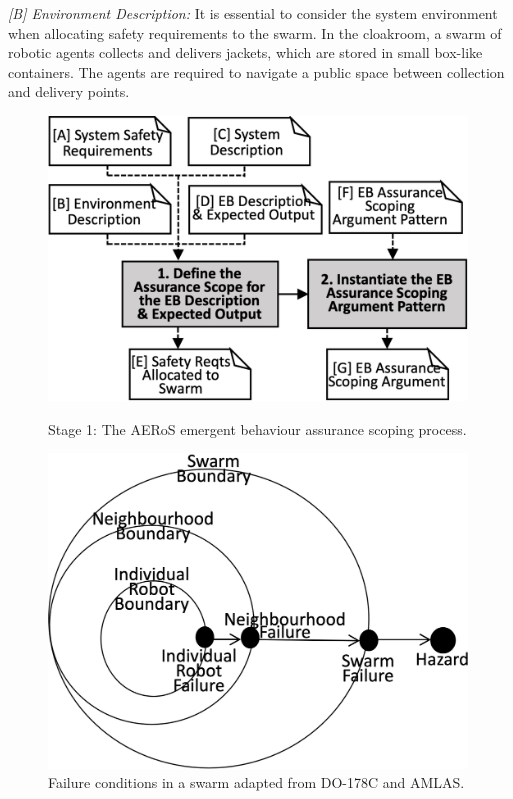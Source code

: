 \documentclass[runningheads]{llncs}
\begin{document}
	\emph{[B] Environment Description:}
	It is essential to consider the system environment when allocating safety requirements to the swarm. 
	In the cloakroom, a swarm of robotic agents collects and delivers jackets, which are stored in small box-like containers. 
	The agents are required to navigate a public space between collection and delivery points. 
	\begin{figure}[!b]
		\centering
		\begin{minipage}[b]{.5\textwidth}
			\centering
			\includegraphics[width=0.99\textwidth]{figures/AERoS-Stage1.pdf}
			\caption{Stage 1: The AERoS emergent behaviour assurance scoping process.}
			\label{amlas-a-stage1}
		\end{minipage}%
		\hspace*{.03\textwidth}
		\begin{minipage}[b]{.5\textwidth}
			\includegraphics[width=0.99\textwidth]{figures/stage1-failureevents-v4.png}
			\vspace{-4ex}%
			\caption{Failure conditions in a swarm adapted from DO-178C and AMLAS.}
			\label{failure-events}
		\end{minipage}
		\vspace{-7ex} %
	\end{figure}
	
\end{document}
